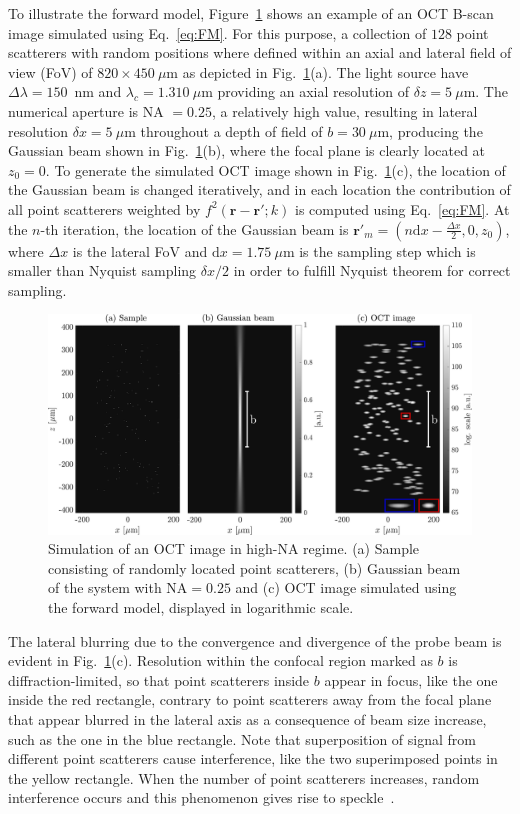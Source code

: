 To illustrate the forward model, Figure~\ref{fig:FM1} shows an example of an OCT B-scan image simulated using Eq.~\ref{eq:FM}. For this purpose, a collection of $128$ point scatterers with random positions where defined within an axial and lateral field of view (FoV) of $820\times 450~\mu$m as depicted in Fig.~\ref{fig:FM1}(a). The light source have $\Delta\lambda=150$~nm and $\lambda_c=1.310~\mu$m providing an axial resolution of $\delta z=5~\mu$m. The numerical aperture is NA $= 0.25$, a relatively high value, resulting in lateral resolution $\delta x=5~\mu$m throughout a depth of field of $b=30~\mu$m, producing the Gaussian beam shown in Fig.~\ref{fig:FM1}(b), where the focal plane is clearly located at $z_0=0$. To generate the simulated OCT image shown in Fig.~\ref{fig:FM1}(c), the location of the Gaussian beam is changed iteratively, and in each location the contribution of all point scatterers weighted by $f^2(\mathbf{r}-\mathbf{r'}; k)$ is computed using Eq.~\ref{eq:FM}. At the $n$-th iteration, the location of the Gaussian beam is $\mathbf{r}'_m=(n\text{d}x - \frac{\Delta x}{2},0,z_0)$, where $\Delta x$ is the lateral FoV and $\text{d}x = 1.75~\mu$m is the sampling step which is smaller than Nyquist sampling $\delta x / 2$ in order to fulfill Nyquist theorem for correct sampling.

\begin{figure}[htb!]
    \centering
    \includegraphics[width=\textwidth]{Figures/TheoreticalBasis/FM-HighNA.pdf}
    \caption[Simulation of an OCT image in high-NA regime.]{Simulation of an OCT image in high-NA regime. (a) Sample consisting of randomly located point scatterers, (b) Gaussian beam of the system with NA$=0.25$ and (c) OCT image simulated using the forward model, displayed in logarithmic scale.}
    \label{fig:FM1}
\end{figure}

The lateral blurring due to the convergence and divergence of the probe beam is evident in Fig.~\ref{fig:FM1}(c). Resolution within the confocal region marked as $b$ is diffraction-limited, so that point scatterers inside $b$ appear in focus, like the one inside the red rectangle, contrary to point scatterers away from the focal plane that appear blurred in the lateral axis as a consequence of beam size increase, such as the one in the blue rectangle. Note that superposition of signal from different point scatterers cause interference, like the two superimposed points in the yellow rectangle. When the number of point scatterers increases, random interference occurs and this phenomenon gives rise to speckle~\cite{Goodman2007_Speckle}.

